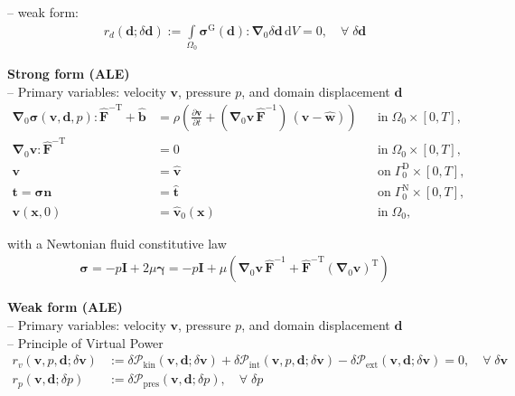 \documentclass[a4paper,12pt]{report}
\newcommand{\bs}[1]{\boldsymbol{#1}}
\newcommand{\Om}{\mathit{\Omega}}
\newcommand{\Gm}{\mathit{\Gamma}}
\begin{document}
-- weak form:
\begin{equation}
\label{equation-ale-weak-form}
\begin{aligned}
r_{d}(\bs{d};\delta\bs{d}) := \int\limits_{\Om_0}\bs{\sigma}^{\mathrm{G}}(\bs{d}) : \bs{\nabla}_{0}\delta\bs{d}\,\mathrm{d}V = 0, \quad \forall \; \delta\bs{d}
\end{aligned}
\end{equation}


\textbf{Strong form (ALE)}\\

-- Primary variables: velocity $\bs{v}$, pressure $p$, and domain displacement $\bs{d}$
\begin{equation}
\label{equation-fluid-ale-strong-form}
\begin{aligned}
\bs{\nabla}_{0} \bs{\sigma}(\bs{v},\bs{d},p) : \widehat{\bs{F}}^{-\mathrm{T}} + \hat{\bs{b}} &= \rho\left(\frac{\partial\bs{v}}{\partial t} + (\bs{\nabla}_0\bs{v}\,\widehat{\bs{F}}^{-1})\,(\bs{v}-\widehat{\bs{w}})\right) &&\text{in} \; \mathit{\Om}_0 \times [0, T],\\
\bs{\nabla}_{0}\bs{v} : \widehat{\bs{F}}^{-\mathrm{T}} &= 0 &&\text{in} \; \mathit{\Om}_0 \times [0, T],\\
\bs{v} &= \hat{\bs{v}} &&\text{on} \; \mathit{\Gm}_0^{\mathrm{D}} \times [0, T], \\
\bs{t} = \bs{\sigma}\bs{n} &= \hat{\bs{t}} &&\text{on} \; \mathit{\Gm}_0^{\mathrm{N}} \times [0, T], \\
\bs{v}(\bs{x},0) &= \hat{\bs{v}}_{0}(\bs{x}) &&\text{in} \; \mathit{\Om}_0,
\end{aligned}
\end{equation}

with a Newtonian fluid constitutive law
\begin{align}
\bs{\sigma} = -p \bs{I} + 2 \mu \bs{\gamma} = -p \bs{I} + \mu \left(\bs{\nabla}_0 \bs{v}\,\widehat{\bs{F}}^{-1} + \widehat{\bs{F}}^{-\mathrm{T}}(\bs{\nabla}_0 \bs{v})^{\mathrm{T}}\right)
\end{align}

\textbf{Weak form (ALE)}\\

-- Primary variables: velocity $\bs{v}$, pressure $p$, and domain displacement $\bs{d}$\\

-- Principle of Virtual Power
\begin{equation}
\label{equation-fluid-ale-weak-form}
\begin{aligned}
r_v(\bs{v},p,\bs{d};\delta\bs{v}) &:= \delta \mathcal{P}_{\mathrm{kin}}(\bs{v},\bs{d};\delta\bs{v}) + \delta \mathcal{P}_{\mathrm{int}}(\bs{v},p,\bs{d};\delta\bs{v}) - \delta \mathcal{P}_{\mathrm{ext}}(\bs{v},\bs{d};\delta\bs{v}) = 0, \quad \forall \; \delta\bs{v} \\
r_p(\bs{v},\bs{d};\delta p) &:= \delta \mathcal{P}_{\mathrm{pres}}(\bs{v},\bs{d};\delta p), \quad \forall \; \delta p
\end{aligned}
\end{equation}
\end{document}
